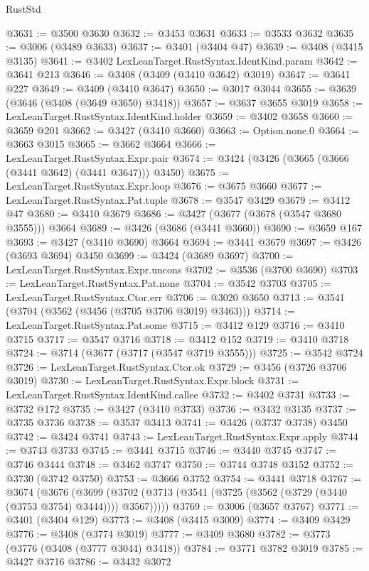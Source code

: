 \begin{lexlean}{RustStd}
\begin{coremodule}
@3631 := @3500 @3630
@3632 := @3453 @3631
@3633 := @3533 @3632
@3635 := @3006 (@3489 @3633)
@3637 := @3401 (@3404 @47)
@3639 := @3408 (@3415 @3135)
@3641 := @3402 LexLeanTarget.RustSyntax.IdentKind.param
@3642 := @3641 @213
@3646 := @3408 (@3409 (@3410 @3642) @3019)
@3647 := @3641 @227
@3649 := @3409 (@3410 @3647)
@3650 := @3017 @3044
@3655 := @3639 (@3646 (@3408 (@3649 @3650) @3418))
@3657 := @3637 @3655 @3019
@3658 := LexLeanTarget.RustSyntax.IdentKind.holder
@3659 := @3402 @3658
@3660 := @3659 @201
@3662 := @3427 (@3410 @3660)
@3663 := Option.none.{0}
@3664 := @3663 @3015
@3665 := @3662 @3664
@3666 := LexLeanTarget.RustSyntax.Expr.pair
@3674 := @3424 (@3426 (@3665 (@3666 (@3441 @3642) (@3441 @3647))) @3450)
@3675 := LexLeanTarget.RustSyntax.Expr.loop
@3676 := @3675 @3660
@3677 := LexLeanTarget.RustSyntax.Pat.tuple
@3678 := @3547 @3429
@3679 := @3412 @47
@3680 := @3410 @3679
@3686 := @3427 (@3677 (@3678 (@3547 @3680 @3555))) @3664
@3689 := @3426 (@3686 (@3441 @3660))
@3690 := @3659 @167
@3693 := @3427 (@3410 @3690) @3664
@3694 := @3441 @3679
@3697 := @3426 (@3693 @3694) @3450
@3699 := @3424 (@3689 @3697)
@3700 := LexLeanTarget.RustSyntax.Expr.uncons
@3702 := @3536 (@3700 @3690)
@3703 := LexLeanTarget.RustSyntax.Pat.none
@3704 := @3542 @3703
@3705 := LexLeanTarget.RustSyntax.Ctor.err
@3706 := @3020 @3650
@3713 := @3541 (@3704 (@3562 (@3456 (@3705 @3706 @3019) @3463)))
@3714 := LexLeanTarget.RustSyntax.Pat.some
@3715 := @3412 @129
@3716 := @3410 @3715
@3717 := @3547 @3716
@3718 := @3412 @152
@3719 := @3410 @3718
@3724 := @3714 (@3677 (@3717 (@3547 @3719 @3555)))
@3725 := @3542 @3724
@3726 := LexLeanTarget.RustSyntax.Ctor.ok
@3729 := @3456 (@3726 @3706 @3019)
@3730 := LexLeanTarget.RustSyntax.Expr.block
@3731 := LexLeanTarget.RustSyntax.IdentKind.callee
@3732 := @3402 @3731
@3733 := @3732 @172
@3735 := @3427 (@3410 @3733)
@3736 := @3432 @3135
@3737 := @3735 @3736
@3738 := @3537 @3413
@3741 := @3426 (@3737 @3738) @3450
@3742 := @3424 @3741
@3743 := LexLeanTarget.RustSyntax.Expr.apply
@3744 := @3743 @3733
@3745 := @3441 @3715
@3746 := @3440 @3745
@3747 := @3746 @3444
@3748 := @3462 @3747
@3750 := @3744 @3748 @3152
@3752 := @3730 (@3742 @3750)
@3753 := @3666 @3752
@3754 := @3441 @3718
@3767 := @3674
    (@3676
      (@3699 (@3702 (@3713 (@3541 (@3725 (@3562 (@3729 (@3440 (@3753 @3754) @3444)))) @3567)))))
@3769 := @3006 (@3657 @3767)
@3771 := @3401 (@3404 @129)
@3773 := @3408 (@3415 @3009)
@3774 := @3409 @3429
@3776 := @3408 (@3774 @3019)
@3777 := @3409 @3680
@3782 := @3773 (@3776 (@3408 (@3777 @3044) @3418))
@3784 := @3771 @3782 @3019
@3785 := @3427 @3716
@3786 := @3432 @3072

\end{coremodule}
\end{lexlean}
